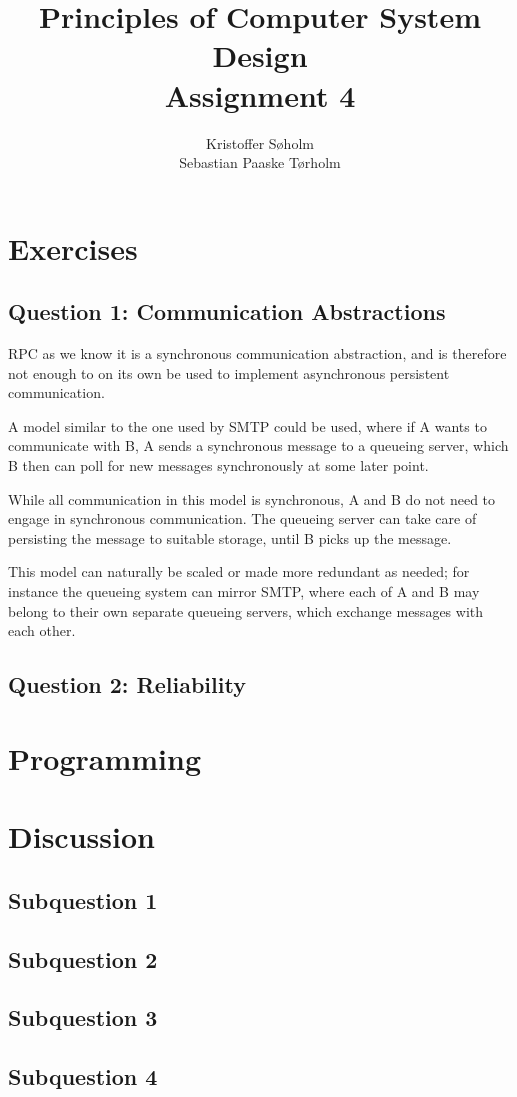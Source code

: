 \documentclass[11pt,a4paper]{article}
\title{Principles of Computer System Design\\Assignment 4}
\author{Kristoffer Søholm\\Sebastian Paaske Tørholm}
\begin{document}
\maketitle

\section{Exercises}
\subsection{Question 1: Communication Abstractions}

RPC as we know it is a synchronous communication abstraction, and is therefore
not enough to on its own be used to implement asynchronous persistent
communication.

A model similar to the one used by SMTP could be used, where if A wants to
communicate with B, A sends a synchronous message to a queueing server, which
B then can poll for new messages synchronously at some later point.

While all communication in this model is synchronous, A and B do not need to
engage in synchronous communication. The queueing server can take care of
persisting the message to suitable storage, until B picks up the message.

This model can naturally be scaled or made more redundant as needed; for
instance the queueing system can mirror SMTP, where each of A and B may belong
to their own separate queueing servers, which exchange messages with each
other.

\subsection{Question 2: Reliability} 


\section{Programming}


\section{Discussion}

\subsection{Subquestion 1}


\subsection{Subquestion 2}

\subsection{Subquestion 3}


\subsection{Subquestion 4}

\end{document}
